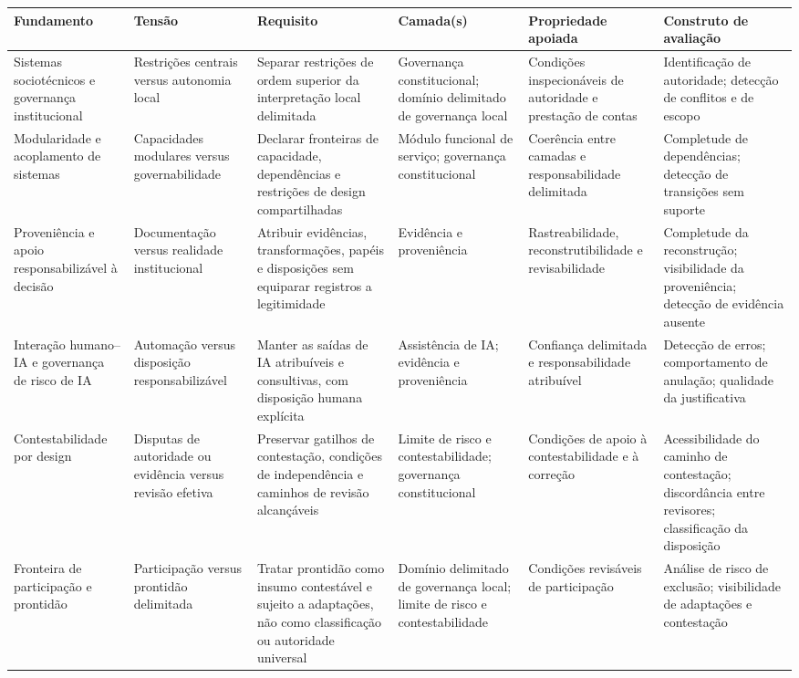 \documentclass[11pt]{article}
\begin{document}
\begin{landscape}
\begin{center}
\scriptsize
\begin{tabularx}{\linewidth}{|X|X|X|X|X|X|}
\hline
\textbf{Fundamento} & \textbf{Tensão} & \textbf{Requisito} &
\textbf{Camada(s)} & \textbf{Propriedade apoiada} &
\textbf{Construto de avaliação} \\
\hline
Sistemas sociotécnicos e governança institucional & Restrições centrais versus
autonomia local & Separar restrições de ordem superior da interpretação local
delimitada & Governança constitucional; domínio delimitado de governança local
& Condições inspecionáveis de autoridade e prestação de contas & Identificação
de autoridade; detecção de conflitos e de escopo \\
\hline
Modularidade e acoplamento de sistemas & Capacidades modulares versus
governabilidade & Declarar fronteiras de capacidade, dependências e restrições
de design compartilhadas & Módulo funcional de serviço; governança
constitucional & Coerência entre camadas e responsabilidade delimitada &
Completude de dependências; detecção de transições sem suporte \\
\hline
Proveniência e apoio responsabilizável à decisão & Documentação versus
realidade institucional & Atribuir evidências, transformações, papéis e
disposições sem equiparar registros a legitimidade & Evidência e proveniência &
Rastreabilidade, reconstrutibilidade e revisabilidade & Completude da
reconstrução; visibilidade da proveniência; detecção de evidência ausente \\
\hline
Interação humano--IA e governança de risco de IA & Automação versus disposição
responsabilizável & Manter as saídas de IA atribuíveis e consultivas, com
disposição humana explícita & Assistência de IA; evidência e proveniência &
Confiança delimitada e responsabilidade atribuível & Detecção de erros;
comportamento de anulação; qualidade da justificativa \\
\hline
Contestabilidade por design & Disputas de autoridade ou evidência versus
revisão efetiva & Preservar gatilhos de contestação, condições de independência
e caminhos de revisão alcançáveis & Limite de risco e contestabilidade;
governança constitucional & Condições de apoio à contestabilidade e à correção
& Acessibilidade do caminho de contestação; discordância entre revisores;
classificação da disposição \\
\hline
Fronteira de participação e prontidão & Participação versus prontidão
delimitada & Tratar prontidão como insumo contestável e sujeito a adaptações,
não como classificação ou autoridade universal & Domínio delimitado de
governança local; limite de risco e contestabilidade & Condições revisáveis de
participação & Análise de risco de exclusão; visibilidade de adaptações e
contestação \\
\hline
\end{tabularx}
\end{center}
\end{landscape}
\end{document}
